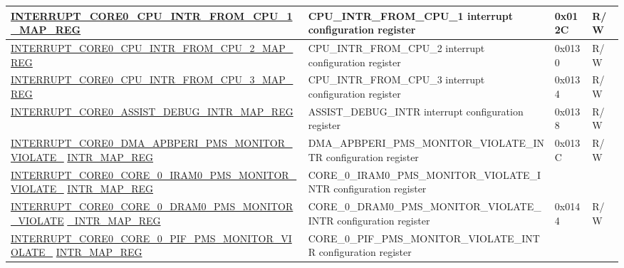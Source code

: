 \begin{landscape}
\begin{longtable}{ | p{10cm} | p{10.2cm} | p{1.3cm} | p{1cm} | }
\hyperref[regdesc:INTERRUPTCORE0CPUINTRFROMCPU1MAPREG]{INTERRUPT\_CORE0\_CPU\_INTR\_FROM\_CPU\_1\_MAP\_REG} & CPU\_INTR\_FROM\_CPU\_1 interrupt configuration register & 0x012C & R/W \\ \hline
\hyperref[regdesc:INTERRUPTCORE0CPUINTRFROMCPU2MAPREG]{INTERRUPT\_CORE0\_CPU\_INTR\_FROM\_CPU\_2\_MAP\_REG} & CPU\_INTR\_FROM\_CPU\_2 interrupt configuration register & 0x0130 & R/W \\ \hline
\hyperref[regdesc:INTERRUPTCORE0CPUINTRFROMCPU3MAPREG]{INTERRUPT\_CORE0\_CPU\_INTR\_FROM\_CPU\_3\_MAP\_REG} & CPU\_INTR\_FROM\_CPU\_3 interrupt configuration register & 0x0134 & R/W \\ \hline
\hyperref[regdesc:INTERRUPTCORE0ASSISTDEBUGINTRMAPREG]{INTERRUPT\_CORE0\_ASSIST\_DEBUG\_INTR\_MAP\_REG} & ASSIST\_DEBUG\_INTR interrupt configuration register & 0x0138 & R/W \\ \hline
\hyperref[regdesc:INTERRUPTCORE0DMAAPBPERIPMSMONITORVIOLATEINTRMAPREG]{INTERRUPT\_CORE0\_DMA\_APBPERI\_PMS\_MONITOR\_VIOLATE\_} 
\hyperref[regdesc:INTERRUPTCORE0DMAAPBPERIPMSMONITORVIOLATEINTRMAPREG]{INTR\_MAP\_REG} 
& DMA\_APBPERI\_PMS\_MONITOR\_VIOLATE\_INTR configuration
register
& \multirow{2}{*}{0x013C} & \multirow{2}{*}{R/W} \\ \hline


\hyperref[regdesc:INTERRUPTCORE0CORE0IRAM0PMSMONITORVIOLATEINTRMAPREG]{INTERRUPT\_CORE0\_CORE\_0\_IRAM0\_PMS\_MONITOR\_VIOLATE\_} 
\hyperref[regdesc:INTERRUPTCORE0CORE0IRAM0PMSMONITORVIOLATEINTRMAPREG]{INTR\_MAP\_REG}
& CORE\_0\_IRAM0\_PMS\_MONITOR\_VIOLATE\_INTR configuration 
register 
& \multirow{2}{*}{0x0140} & \multirow{2}{*}{R/W} \\ \hline


\hyperref[regdesc:INTERRUPTCORE0CORE0DRAM0PMSMONITORVIOLATEINTRMAPREG]{INTERRUPT\_CORE0\_CORE\_0\_DRAM0\_PMS\_MONITOR\_VIOLATE} 
\hyperref[regdesc:INTERRUPTCORE0CORE0DRAM0PMSMONITORVIOLATEINTRMAPREG]{\_INTR\_MAP\_REG} 
& CORE\_0\_DRAM0\_PMS\_MONITOR\_VIOLATE\_INTR configuration register & \multirow{2}{*}{0x0144} & \multirow{2}{*}{R/W} \\ \hline


\hyperref[regdesc:INTERRUPTCORE0CORE0PIFPMSMONITORVIOLATEINTRMAPREG]{INTERRUPT\_CORE0\_CORE\_0\_PIF\_PMS\_MONITOR\_VIOLATE\_} 
\hyperref[regdesc:INTERRUPTCORE0CORE0PIFPMSMONITORVIOLATEINTRMAPREG]{INTR\_MAP\_REG} 
& CORE\_0\_PIF\_PMS\_MONITOR\_VIOLATE\_INTR configuration register & \multirow{2}{*}{0x0148} & \multirow{2}{*}{R/W} \\ \hline



\end{longtable}
\end{landscape}
